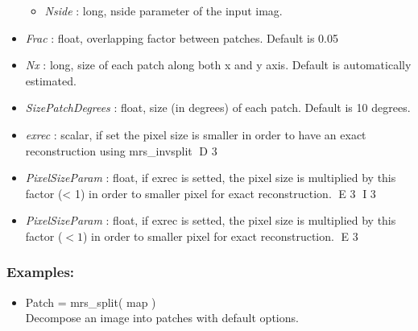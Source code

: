 \begin{itemize}
\begin{itemize}
\item {\em Nside} : long, nside parameter of the input imag.
\end{itemize}
\item {\em Frac} : float, overlapping factor between patches. Default is 0.05
\item {\em Nx} : long, size of each patch along both x and y axis. Default is automatically estimated.
\item {\em SizePatchDegrees} : float, size (in degrees) of each patch. Default is 10 degrees.
\item {\em exrec} : scalar, if set the pixel size is smaller in order to have an exact reconstruction using mrs\_invsplit
D 3
\item {\em PixelSizeParam} : float, if exrec is setted, the pixel size is multiplied by this factor (< 1) in order to smaller pixel for exact reconstruction.
E 3
I 3
\item {\em PixelSizeParam} : float, if exrec is setted, the pixel size is multiplied by this factor ($< 1$) in order to smaller pixel for exact reconstruction.
E 3
\end{itemize}

\subsubsection*{Examples:} 
\begin{itemize}
\item Patch = mrs\_split( map ) \\
Decompose an image into patches with default options.
\end{itemize}



